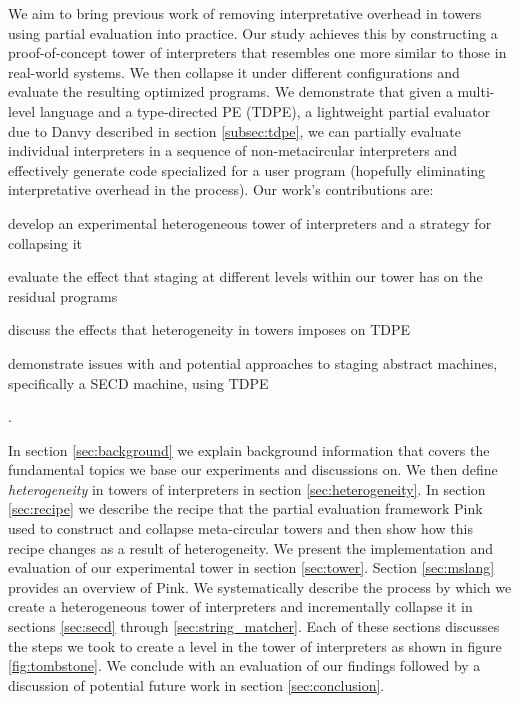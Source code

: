 \documentclass[a4paper,12pt,twoside,openright]{report}
\theoremstyle{definition}
\begin{document}
We aim to bring previous work of removing interpretative overhead in towers using partial evaluation into practice. Our study achieves this by constructing a proof-of-concept tower of interpreters that resembles one more similar to those in real-world systems. We then collapse it under different configurations and evaluate the resulting optimized programs. We demonstrate that given a multi-level language and a type-directed PE (TDPE), a lightweight partial evaluator due to Danvy \cite{danvy1999type} described in section \ref{subsec:tdpe}, we can partially evaluate individual interpreters in a sequence of non-metacircular interpreters and effectively generate code specialized for a user program (hopefully eliminating interpretative overhead in the process). Our work's contributions are:
\begin{enumerate*}[label=(\arabic*)]
	\item develop an experimental heterogeneous tower of interpreters and a strategy for collapsing it
	\item evaluate the effect that staging at different levels within our tower has on the residual programs
	\item discuss the effects that heterogeneity in towers imposes on TDPE
	\item demonstrate issues with and potential approaches to staging abstract machines, specifically a SECD machine, using TDPE
\end{enumerate*}.

In section \ref{sec:background} we explain background information that covers the fundamental topics we base our experiments and discussions on. We then define \textit{heterogeneity} in towers of interpreters in section \ref{sec:heterogeneity}. In section \ref{sec:recipe} we describe the recipe that the partial evaluation framework Pink \cite{amin2017collapsing} used to construct and collapse meta-circular towers and then show how this recipe changes as a result of heterogeneity. We present the implementation and evaluation of our experimental tower in section \ref{sec:tower}. Section \ref{sec:mslang} provides an overview of Pink. We systematically describe the process by which we create a heterogeneous tower of interpreters and incrementally collapse it in sections \ref{sec:secd} through \ref{sec:string_matcher}. Each of these sections discusses the steps we took to create a level in the tower of interpreters as shown in figure \ref{fig:tombstone}. We conclude with an evaluation of our findings followed by a discussion of potential future work in section \ref{sec:conclusion}.
\end{document}
